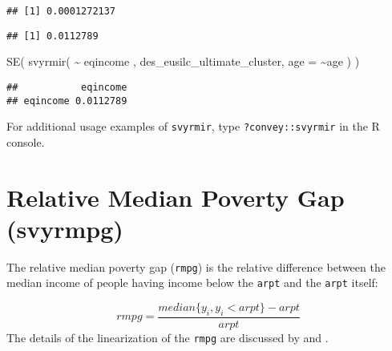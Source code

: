 \documentclass[
]{book}
\newenvironment{Shaded}{\begin{snugshade}}{\end{snugshade}}
\newcommand{\AttributeTok}[1]{\textcolor[rgb]{0.77,0.63,0.00}{#1}}
\newcommand{\CommentTok}[1]{\textcolor[rgb]{0.56,0.35,0.01}{\textit{#1}}}
\newcommand{\FunctionTok}[1]{\textcolor[rgb]{0.00,0.00,0.00}{#1}}
\newcommand{\NormalTok}[1]{#1}
\newcommand{\SpecialCharTok}[1]{\textcolor[rgb]{0.00,0.00,0.00}{#1}}
\begin{document}
\begin{Shaded}
\end{Shaded}

\begin{verbatim}
## [1] 0.0001272137
\end{verbatim}

\begin{Shaded}
\end{Shaded}

\begin{verbatim}
## [1] 0.0112789
\end{verbatim}

\begin{Shaded}
\begin{Highlighting}[]
\FunctionTok{SE}\NormalTok{( }\FunctionTok{svyrmir}\NormalTok{( }\SpecialCharTok{\textasciitilde{}}\NormalTok{ eqincome , des\_eusilc\_ultimate\_cluster, }\AttributeTok{age =} \SpecialCharTok{\textasciitilde{}}\NormalTok{age ) ) }
\end{Highlighting}
\end{Shaded}

\begin{verbatim}
##           eqincome
## eqincome 0.0112789
\end{verbatim}

For additional usage examples of \texttt{svyrmir}, type \texttt{?convey::svyrmir} in the R console.

\hypertarget{relative-median-poverty-gap-svyrmpg}{%
\section{Relative Median Poverty Gap (svyrmpg)}\label{relative-median-poverty-gap-svyrmpg}}

The relative median poverty gap (\texttt{rmpg}) is the relative difference between the median income of people having income below the \texttt{arpt} and the \texttt{arpt} itself:

\[
rmpg = \frac{median\{y_i, y_i<arpt\}-arpt}{arpt}
\]
The details of the linearization of the \texttt{rmpg} are discussed by \textcite{deville1999} and \textcite{osier2009}.
\end{document}
